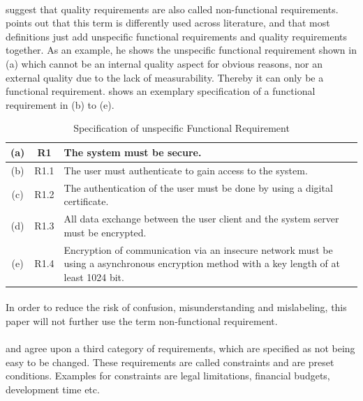 \paragraph{} \textcite[cf.][15]{Lauesen.2008} suggest that quality requirements are also called non-functional requirements. \textcite[cf.][16-17]{Pohl.2007} points out that this term is differently used across literature, and that most definitions just add unspecific functional requirements and quality requirements together. As an example, he shows the unspecific functional requirement shown in  (a) which cannot be an internal quality aspect for obvious reasons, nor an external quality due to the lack of measurability. Thereby it can only be a functional requirement. \textcite[17]{Pohl.2007} shows an exemplary specification of a  functional requirement in  (b) to (e).

\begin{table}[H]
    \centering
    \begin{tabular}{|c|c|m{10cm}|}
        \hline
        (a) & R1 & The system  must be secure.\\
         \hline
        \hline
        (b) & R1.1 & The user must authenticate to gain access to the system.\\
        \hline
        (c) & R1.2 & The authentication of the user must be done by using a digital certificate.\\
        \hline
        (d) & R1.3 & All data exchange between the user client and the system server must be encrypted.\\
        \hline
        (e) & R1.4 & Encryption of communication via an insecure network must be using a asynchronous encryption method with a key length of at least 1024 bit.\\
        \hline
    \end{tabular}
    \caption[Specification of unspecific Functional Requirement]{Specification of unspecific Functional Requirement \parencite[17]{Pohl.2007}}
    \label{tab:reqSpec}
\end{table}

\paragraph{} In order to reduce the risk of confusion, misunderstanding and mislabeling, this paper will not further use the term non-functional requirement.
\paragraph{} \textcite[29]{Ebert.2014} and \textcite[18-19]{Pohl.2007} agree upon a third category of requirements, which are specified as not being easy to be changed. These requirements are called constraints and are preset conditions. Examples for constraints are legal limitations, financial budgets, development time etc.
